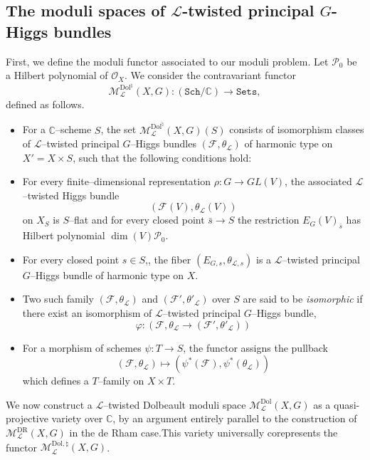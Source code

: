 \documentclass[12pt,reqno]{amsart}
\numberwithin{equation}{subsection}
\theoremstyle{definition}
\theoremstyle{theorem}
\begin{document}
\subsection{The moduli spaces of $\mathcal{L}$-twisted principal $G$-Higgs bundles}

First, we define the moduli functor associated to our moduli problem.
Let $\mathcal{P}_{0}$ be a Hilbert polynomial of $\mathcal{O}_{X}$.
We consider the contravariant functor
\[
\mathcal{M}^{\mathrm{Dol}^{\natural}}_{\mathcal{L}}(X,G)
\colon (\texttt{Sch}/\mathbb{C}) \longrightarrow \texttt{Sets},
\]
defined as follows.

\begin{itemize}\label{moduli-of-L-twisted princpal G--Higgs bundles}
	\item
	For a $\mathbb{C}$--scheme $S$, the set
	$\mathcal{M}^{\mathrm{Dol}^{\natural}}_{\mathcal{L}}(X,G)(S)$
	consists of isomorphism classes of $\mathcal{L}$--twisted principal $G$--Higgs bundles  $(\mathcal{F},\theta_{\mathcal{L}})$ of harmonic type on $X'=X\times S$, such that the following conditions hold:
    \item[(i)]
 	For every finite--dimensional representation
 	$\rho \colon G \to GL(V)$,
 	the associated $\mathcal{L}$--twisted Higgs bundle
 	\[
 	(\mathcal{F}(V),\theta_{\mathcal{L}}(V))
 	\]
 	on $X_S$ is $S$--flat and for every closed point $\bar{s}\rightarrow S$ the restriction $E_{G}(V)_{\bar{s}}$ has Hilbert polynomial $\dim(V)\mathcal{P}_{0}$.
 	
 	\item[(ii)]
 	For every closed point $s \in S$,, the fiber $(E_{G,s}, \theta_{\mathcal L,s})$ is a $\mathcal{L}$--twisted principal $G$--Higgs bundle of harmonic type on $X$.
 	
 \item Two such family $(\mathcal{F},\theta_{\mathcal{L}})$ and $(\mathcal{F}',\theta'_{\mathcal L})$ over $S$ are said to be \textit{isomorphic} if there exist an isomorphism of $\mathcal{L}$--twisted principal $G$--Higgs bundle, \[\varphi:(\mathcal{F},\theta_{\mathcal L}\rightarrow (\mathcal{F}',\theta'_{\mathcal L}))\]
 
 \item For a morphism of schemes $\psi:T\rightarrow S$, the functor assigns the pullback \[(\mathcal{F}, \theta_{\mathcal L})\mapsto (\psi^{*}(\mathcal{F}),\psi^{*}(\theta_{\mathcal L}))\]which defines a $T$--family on $X\times T$.
 \end{itemize}
 

We now construct a $\mathcal{L}$--twisted Dolbeault moduli space $\mathcal{M}^{\mathrm{Dol}}_{\mathcal{L}}(X,G)$ as a quasi-projective variety over $\mathbb{C}$, by an argument entirely parallel to the construction of $\mathcal{M}^{\text{DR}}_{\mathcal{L}}(X,G)$ in the de Rham case.This variety universally corepresents the functor $\mathcal{M}^{\mathrm{Dol},\natural}_{\mathcal{L}}(X,G)$.
\end{document}
